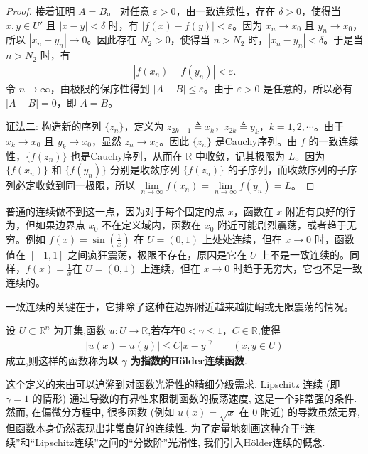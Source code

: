 \documentclass[../../main.tex]{subfiles}
\begin{document}
\begin{remark}
\begin{proof}
接着证明 $A = B$。
对任意 $\varepsilon > 0$，由一致连续性，存在 $\delta > 0$，使得当 $x, y \in U'$ 且 $|x - y| < \delta$ 时，有 $|f(x) - f(y)| < \varepsilon$。因为 $x_n \to x_0$ 且 $y_n \to x_0$，所以 $|x_n - y_n| \to 0$。因此存在 $N_2 > 0$，使得当 $n > N_2$ 时，$|x_n - y_n| < \delta$。于是当 $n > N_2$ 时，有
\begin{align*}
|f(x_n) - f(y_n)| < \varepsilon.
\end{align*}
令 $n \to \infty$，由极限的保序性得到 $|A - B| \leqslant \varepsilon$。由于 $\varepsilon > 0$ 是任意的，所以必有 $|A - B| = 0$，即 $A = B$。

{\color{blue}证法二:}
构造新的序列 $\{z_n\}$，定义为 $z_{2k-1} \triangleq x_k$，$z_{2k} \triangleq y_k$，$k = 1, 2, \cdots$。由于 $x_k \to x_0$ 且 $y_k \to x_0$，显然 $z_n \to x_0$。因此 $\{z_n\}$ 是Cauchy序列。由 $f$ 的一致连续性，$\{f(z_n)\}$ 也是Cauchy序列，从而在 $\mathbb{R}$ 中收敛，记其极限为 $L$。因为 $\{f(x_n)\}$ 和 $\{f(y_n)\}$ 分别是收敛序列 $\{f(z_n)\}$ 的子序列，而收敛序列的子序列必定收敛到同一极限，所以 $\lim\limits_{n \to \infty} f(x_n) = \lim\limits_{n \to \infty} f(y_n) = L$。
\end{proof}

普通的连续做不到这一点，因为对于每个固定的点 $x$，函数在 $x$ 附近有良好的行为，但如果边界点 $x_0$ 不在定义域内，函数在 $x_0$ 附近可能剧烈震荡，或者趋于无穷。例如 $f(x) = \sin\left(\frac{1}{x}\right)$ 在 $U = (0, 1)$ 上处处连续，但在 $x \to 0$ 时，函数值在 $[-1, 1]$ 之间疯狂震荡，极限不存在，原因是它在 $U$ 上不是一致连续的。同样，$f(x) = \frac{1}{x}$在 $U = (0, 1)$ 上连续，但在 $x \to 0$ 时趋于无穷大，它也不是一致连续的。

一致连续的关键在于，它排除了这种在边界附近越来越陡峭或无限震荡的情况。
\end{remark}

\begin{definition}
设 $U\subset\mathbb{R}^{n}$ 为开集,函数 $u:U\to\mathbb{R}$,若存在$0<\gamma\leqslant 1$，$C\in \mathbb{R}$,使得
\begin{align}
|u(x)-u(y)|\leqslant C|x-y|^{\gamma} \qquad (x,y\in U)
\label{align:ch05-holder}
\end{align}
成立,则这样的函数称为\textbf{以 $\gamma$ 为指数的H\"older连续函数}.
\end{definition}
\begin{remark}
这个定义的来由可以追溯到对函数光滑性的精细分级需求. Lipschitz 连续 (即 $\gamma=1$ 的情形) 通过导数的有界性来限制函数的振荡速度, 这是一个非常强的条件. 然而, 在偏微分方程中, 很多函数 (例如 $u(x)=\sqrt{x}$ 在 $0$ 附近) 的导数虽然无界, 但函数本身仍然表现出非常良好的连续性. 为了定量地刻画这种介于“连续”和“Lipschitz连续”之间的“分数阶”光滑性, 我们引入H\"older连续的概念. 
\end{remark}
\end{document}

